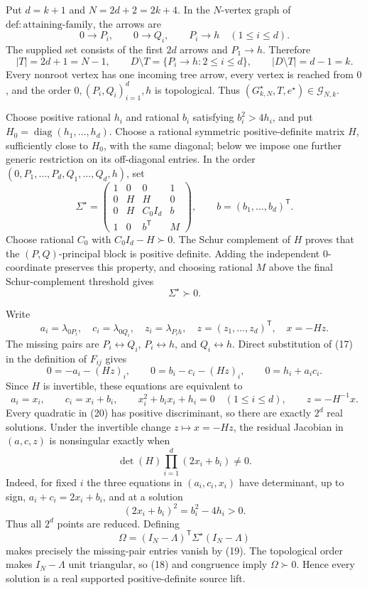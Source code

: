 Put \(d=k+1\) and \(N=2d+2=2k+4\).  In the \(N\)-vertex graph of \(\mathrm{def:attaining\mbox{-}family}\), the arrows are
\[
 0\to P_i,\qquad 0\to Q_i,\qquad P_i\to h
 \quad(1\le i\le d).
\]
The supplied set consists of the first \(2d\) arrows and \(P_1\to h\).  Therefore
\[
 |T|=2d+1=N-1,\qquad
 D\setminus T=\{P_i\to h:2\le i\le d\},\qquad
 |D\setminus T|=d-1=k.
\tag{16}
\]
Every nonroot vertex has one incoming tree arrow, every vertex is reached from \(0\), and the order \(0,(P_i,Q_i)_{i=1}^d,h\) is topological.  Thus \((G^{\star}_{k,N},T,e^{\star})\in\mathcal G_{N,k}\).

Choose positive rational \(h_i\) and rational \(b_i\) satisfying \(b_i^2>4h_i\), and put \(H_0=\operatorname{diag}(h_1,\ldots,h_d)\).  Choose a rational symmetric positive-definite matrix \(H\), sufficiently close to \(H_0\), with the same diagonal; below we impose one further generic restriction on its off-diagonal entries.  In the order \((0,P_1,\ldots,P_d,Q_1,\ldots,Q_d,h)\), set
\[
 \Sigma^{\star}=
 \begin{pmatrix}
  1&0&0&1\\
  0&H&H&0\\
  0&H&C_0I_d&b\\
  1&0&b^{\mathsf T}&M
 \end{pmatrix},
 \qquad b=(b_1,\ldots,b_d)^{\mathsf T}.
\tag{17}
\]
Choose rational \(C_0\) with \(C_0I_d-H\succ0\).  The Schur complement of \(H\) proves that the \((P,Q)\)-principal block is positive definite.  Adding the independent \(0\)-coordinate preserves this property, and choosing rational \(M\) above the final Schur-complement threshold gives
\[
 \Sigma^{\star}\succ0.
\tag{18}
\]

Write
\[
 a_i=\lambda_{0P_i},\quad c_i=\lambda_{0Q_i},\quad
 z_i=\lambda_{P_i h},\quad z=(z_1,\ldots,z_d)^{\mathsf T},
 \quad x=-Hz.
\]
The missing pairs are \(P_i\leftrightarrow Q_i\), \(P_i\leftrightarrow h\), and \(Q_i\leftrightarrow h\).  Direct substitution of (17) in the definition of \(F_{ij}\) gives
\[
 0=-a_i-(Hz)_i,\qquad
 0=b_i-c_i-(Hz)_i,\qquad
 0=h_i+a_ic_i.
\tag{19}
\]
Since \(H\) is invertible, these equations are equivalent to
\[
 a_i=x_i,\qquad c_i=x_i+b_i,\qquad
 x_i^2+b_ix_i+h_i=0\quad(1\le i\le d),\qquad
 z=-H^{-1}x.
\tag{20}
\]
Every quadratic in (20) has positive discriminant, so there are exactly \(2^d\) real solutions.  Under the invertible change \(z\mapsto x=-Hz\), the residual Jacobian in \((a,c,z)\) is nonsingular exactly when
\[
 \det(H)\prod_{i=1}^d(2x_i+b_i)\ne0.
\tag{21}
\]
Indeed, for fixed \(i\) the three equations in \((a_i,c_i,x_i)\) have determinant, up to sign, \(a_i+c_i=2x_i+b_i\), and at a solution
\[
 (2x_i+b_i)^2=b_i^2-4h_i>0.
\]
Thus all \(2^d\) points are reduced.  Defining
\[
 \Omega=(I_N-\Lambda)^{\mathsf T}\Sigma^{\star}(I_N-\Lambda)
\tag{22}
\]
makes precisely the missing-pair entries vanish by (19).  The topological order makes \(I_N-\Lambda\) unit triangular, so (18) and congruence imply \(\Omega\succ0\).  Hence every solution is a real supported positive-definite source lift.

